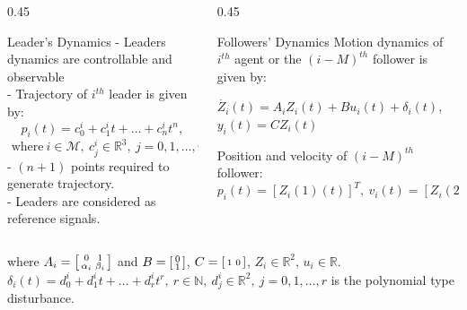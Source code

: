 \begin{frame}{}
		\vspace{-0.5cm}
	\begin{columns}
		\begin{column}{0.45\textwidth}
			\begin{block}{Leader's Dynamics}
				- Leaders dynamics are controllable and observable\\
				- Trajectory of $i^{th}$ leader is given by:
				$$	p_{i}(t)=c_{0}^{i}+c_{1}^{i}t+\dots+c_{n}^{i}t^{n},$$
				$\text{ where} \: i \in \mathcal{M},\: c_{j}^{i}\in \mathbb{R}^{3},\: j= 0,1,\dots,n$\\
				- $(n+1)$ points required to generate trajectory.\\
				- Leaders are considered as reference signals.
			\end{block}
		\end{column}
		\begin{column}{0.45\textwidth}
			\begin{block}{Followers' Dynamics}
				Motion dynamics of $i^{th}$ agent or the $(i-M)^{th}$ follower is given by:\\
				\begin{center}
					$\dot{Z_i}(t)=A_iZ_{i}(t)+Bu_{i}(t)+\delta_{i}(t)$,\\
					$y_i(t)=CZ_i(t)$
				\end{center}
				Position and velocity of $(i-M)^{th}$ follower:
				$$p_{i}(t)=[Z_{i}(1)(t)]^T,~ v_{i}(t)=[Z_{i}(2)(t)]^T\in \mathbb{R}^{3}$$
			\end{block}
		\end{column}
	\end{columns}
	\vspace*{0.2cm}
	where $A_i=
	\begin{bsmallmatrix}
		0 & 1\\
		\alpha_{i} & \beta_{i}
	\end{bsmallmatrix}$
	and $B=
	\begin{bsmallmatrix}
		0 \\ 1
	\end{bsmallmatrix}$,
	$C=
	\begin{bsmallmatrix}
		1 & 0
	\end{bsmallmatrix}$,
	$Z_{i} \in \mathbb{R}^{2}$, $u_i \in \mathbb{R}$. \\
	$\delta_{i}(t)=d_{0}^{i}+d_{1}^{i}t+\dots+d_{r}^{i}t^{r},\: r\in \mathbb{N}, \: d_{j}^{i}\in \mathbb{R}^{2},\: j=0,1,\dots,r$ is the polynomial type disturbance.
	\end{frame}
